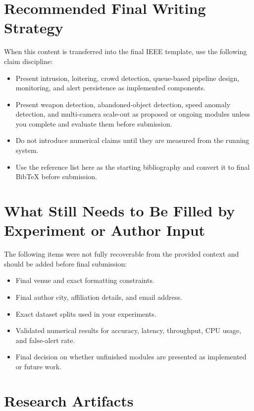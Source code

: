 \documentclass[11pt]{article}
\begin{document}
\section{Recommended Final Writing Strategy}

When this content is transferred into the final IEEE template, use the following claim discipline:

\begin{itemize}
\item Present intrusion, loitering, crowd detection, queue-based pipeline design, monitoring, and alert persistence as implemented components.
\item Present weapon detection, abandoned-object detection, speed anomaly detection, and multi-camera scale-out as proposed or ongoing modules unless you complete and evaluate them before submission.
\item Do not introduce numerical claims until they are measured from the running system.
\item Use the reference list here as the starting bibliography and convert it to final BibTeX before submission.
\end{itemize}

\section{What Still Needs to Be Filled by Experiment or Author Input}

The following items were not fully recoverable from the provided context and should be added before final submission:

\begin{itemize}
\item Final venue and exact formatting constraints.
\item Final author city, affiliation details, and email address.
\item Exact dataset splits used in your experiments.
\item Validated numerical results for accuracy, latency, throughput, CPU usage, and false-alert rate.
\item Final decision on whether unfinished modules are presented as implemented or future work.
\end{itemize}

\section{Research Artifacts}
\label{sec:artifacts}
\end{document}
